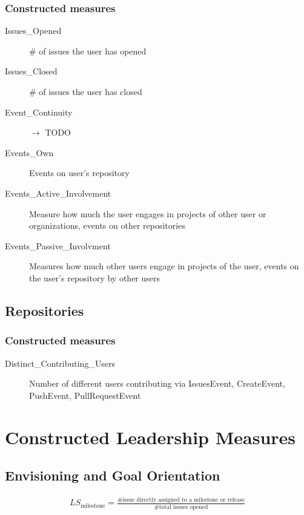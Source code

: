 \documentclass[a4paper,10pt]{article}
\begin{document}
\subsubsection{Constructed measures}
\begin{description}
 \item [Issues\_Opened] \# of issues the user has opened
 \item [Issues\_Closed] \# of issues the user has closed
\item [Event\_Continuity] $\to$ TODO
\item [Events\_Own] Events on user's repository
\item [Events\_Active\_Involvement] Measure how much the user engages in projects of other user or organizations, events on other repositories 
\item [Events\_Passive\_Involvment] Measures how much other users engage in projects of the user, events on the user's repository by other users
\end{description}



\subsection{Repositories}

\subsubsection{Constructed measures}
\begin{description}
 \item [Distinct\_Contributing\_Users] Number of different users contributing via IssuesEvent, CreateEvent, PushEvent, PullRequestEvent
\end{description}


\section{Constructed Leadership Measures}
\subsection{Envisioning and Goal Orientation}

\begin{align}
 LS_{\text{milestone}} = \frac{\text{\# issue directly assigned to a milestone or release}}{\text{\# total issues opened}} 
\end{align}
\end{document}
